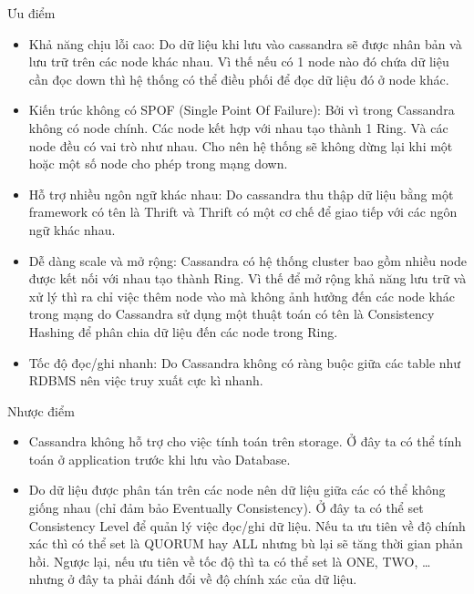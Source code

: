\begin{itemize}
            Ưu điểm
            
            \begin{itemize}
                \item Khả năng chịu lỗi cao: Do dữ liệu khi lưu vào cassandra sẽ được nhân bản và lưu trữ trên các node khác nhau. Vì thế nếu có 1 node nào đó chứa dữ liệu cần đọc down thì hệ thống có thể điều phối để đọc dữ liệu đó ở node khác.
                \item Kiến trúc không có SPOF (Single Point Of Failure): Bởi vì trong Cassandra không có node chính. Các node kết hợp với nhau tạo thành 1 Ring. Và các node đều có vai trò như nhau. Cho nên hệ thống sẽ không dừng lại khi một hoặc một số node cho phép trong mạng down.
                \item Hỗ trợ nhiều ngôn ngữ khác nhau: Do cassandra thu thập dữ liệu bằng một framework có tên là Thrift và Thrift có một cơ chế để giao tiếp với các ngôn ngữ khác nhau.
                \item Dễ dàng scale và mở rộng: Cassandra có hệ thống cluster bao gồm nhiều node được kết nối với nhau tạo thành Ring. Vì thế để mở rộng khả năng lưu trữ và xử lý thì ra chỉ việc thêm node vào mà không ảnh hưởng đến các node khác trong mạng do Cassandra sử dụng một thuật toán có tên là Consistency Hashing để phân chia dữ liệu đến các node trong Ring.
                \item Tốc độ đọc/ghi nhanh: Do Cassandra không có ràng buộc giữa các table như RDBMS nên việc truy xuất cực kì nhanh.
            \end{itemize}
            
            Nhược điểm
            
            \begin{itemize}
                \item Cassandra không hỗ trợ cho việc tính toán trên storage. Ở đây ta có thể tính toán ở application trước khi lưu vào Database.
                \item Do dữ liệu được phân tán trên các node nên dữ liệu giữa các có thể không giống nhau (chỉ đảm bảo Eventually Consistency). Ở đây ta có thể set Consistency Level để quản lý việc đọc/ghi dữ liệu. Nếu ta ưu tiên về độ chính xác thì có thể set là QUORUM hay ALL nhưng bù lại sẽ tăng thời gian phản hồi. Ngược lại, nếu ưu tiên về tốc độ thì ta có thể set là ONE, TWO, … nhưng ở đây ta phải đánh đổi về độ chính xác của dữ liệu.
            \end{itemize}
            

\end{itemize}

